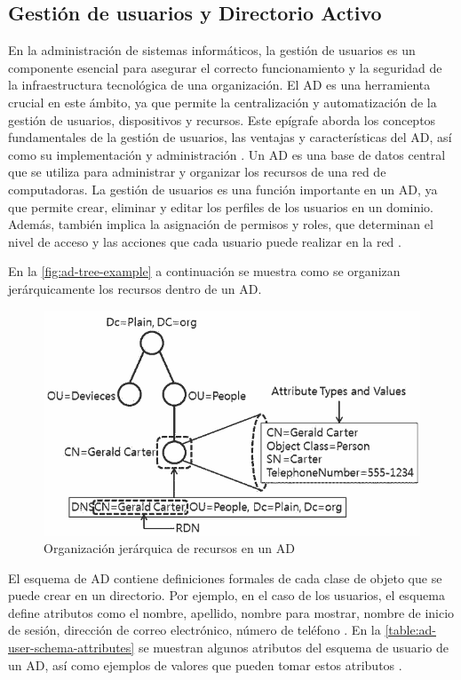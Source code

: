 \subsection{Gestión de usuarios y Directorio Activo}

En la administración de sistemas informáticos, la gestión de usuarios es un componente esencial para asegurar el correcto funcionamiento y la seguridad de la infraestructura tecnológica de una organización. El AD es una herramienta crucial en este ámbito, ya que permite la centralización y automatización de la gestión de usuarios, dispositivos y recursos. Este epígrafe aborda los conceptos fundamentales de la gestión de usuarios, las ventajas y características del AD, así como su implementación y administración \autocite{thakur_user_2015-1,josang_local_2015}.
Un AD es una base de datos central que se utiliza para administrar y organizar los recursos de una red de computadoras. La gestión de usuarios es una función importante en un AD, ya que permite crear, eliminar y editar los perfiles de los usuarios en un dominio. Además, también implica la asignación de permisos y roles, que determinan el nivel de acceso y las acciones que cada usuario puede realizar en la red \autocite{bartlett_samba_2005,dansimp_active_2023,imanudin_active_2019}.

En la \autoref{fig:ad-tree-example} a continuación se muestra como se organizan jerárquicamente los recursos dentro de un AD.

\begin{figure}[H]
    \centering
    \includegraphics[width=\linewidth]{images/ad-tree-2.png}
    \caption{Organización jerárquica de recursos en un AD}
    \label{fig:ad-tree-example}
\end{figure}

El esquema de AD contiene definiciones formales de cada clase de objeto que se puede crear en un directorio. Por ejemplo, en el caso de los usuarios, el esquema define atributos como el nombre, apellido, nombre para mostrar, nombre de inicio de sesión, dirección de correo electrónico, número de teléfono \autocite{harrison_lightweight_2006,voglmaier_abcs_2003,howes_ldap_1997}. En la \autoref{table:ad-user-schema-attributes} se muestran algunos atributos del esquema de usuario de un AD, así como ejemplos de valores que pueden tomar estos atributos \autocite{derdus_user_2024}.

